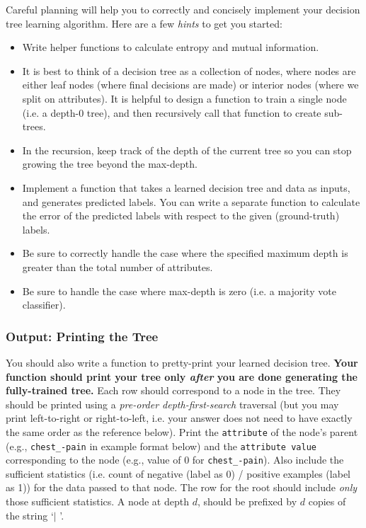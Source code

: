 Careful planning will help you to correctly and concisely implement your decision tree learning algorithm. Here are a few \emph{hints} to get you started:
\begin{itemize}
    \item Write helper functions to calculate entropy and mutual information.
    \item It is best to think of a decision tree as a collection of nodes, where nodes are either leaf nodes (where final decisions are made) or interior nodes (where we split on attributes). It is helpful to design a function to train a single node (i.e. a depth-0 tree), and then recursively call that function to create sub-trees.
    \item In the recursion, keep track of the depth of the current tree so you can stop growing the tree beyond the max-depth.
    \item Implement a function that takes a learned decision tree and data as inputs, and generates predicted labels. You can write a separate function to calculate the error of the predicted labels with respect to the given (ground-truth) labels.
    \item Be sure to correctly handle the case where the specified maximum depth is greater than the total number of attributes.
    \item Be sure to handle the case where max-depth is zero (i.e. a majority vote classifier). 

\end{itemize}


\clearpage

\subsubsection{Output: Printing the Tree}
\label{sec:printtree}

You should also write a function to pretty-print your learned decision tree. \textbf{Your function should print your tree only \emph{after} you are done generating the fully-trained tree.} Each row should correspond to a node in the tree. They should be printed using a \emph{pre-order depth-first-search} traversal (but you may print left-to-right or right-to-left, i.e. your answer does not need to have exactly the same order as the reference below). Print the \texttt{attribute} of the node's parent (e.g., \texttt{chest\_-pain} in example format below) and the \texttt{attribute value} corresponding to the node (e.g., value of 0 for \texttt{chest\_-pain}). Also include the sufficient statistics (i.e. count of negative (label as 0) / positive examples (label as 1)) for the data passed to that node. The row for the root should include \emph{only} those sufficient statistics. A node at depth $d$, should be prefixed by $d$ copies of the string `$\mid$ '.

